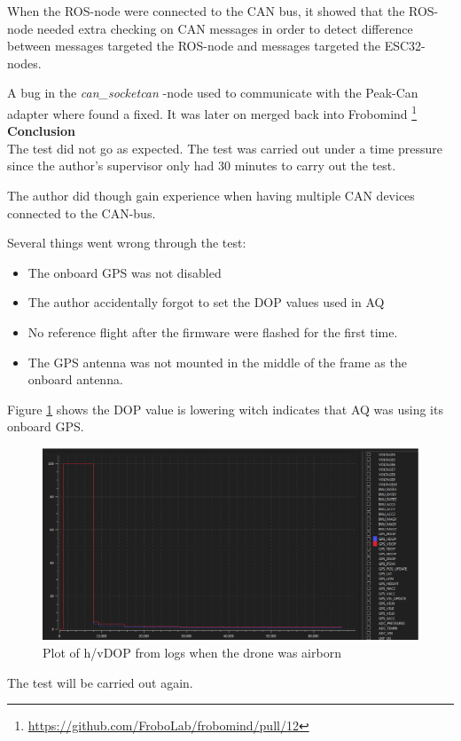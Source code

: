 When the ROS-node were connected to the CAN bus, it showed that the ROS-node needed extra checking on CAN messages in order to detect difference between messages targeted the ROS-node and messages targeted the ESC32-nodes.


A bug in the \textit{can\_socketcan} -node used to communicate with the Peak-Can adapter where found a fixed. It was later on merged back into Frobomind \footnote{\url{https://github.com/FroboLab/frobomind/pull/12}}
\textbf{Conclusion} \\

The test did not go as expected. The test was carried out under a time pressure since the author's supervisor only had 30 minutes to carry out the test.

The author did though gain experience when having multiple CAN devices connected to the CAN-bus.

Several things went wrong through the test:
\begin{itemize}
	\item The onboard GPS was not disabled
	\item The author accidentally forgot to set the DOP values used in AQ
	\item No reference flight after the firmware were flashed for the first time.
	\item The GPS antenna was not mounted in the middle of the frame as the onboard antenna.
\end{itemize}

Figure \ref{fig:qground_station_dop} shows the DOP value is lowering witch indicates that AQ was using its onboard GPS.

\begin{figure}[H]
    \center
    \includegraphics[width=1\textwidth]{graphics/test_qground_station_dop.eps}
  \caption{Plot of h/vDOP from logs when the drone was airborn}
    \label{fig:qground_station_dop}
\end{figure}

The test will be carried out again.
